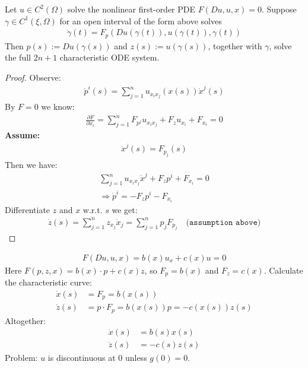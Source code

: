 \begin{theorem}
	Let $u \in C^2(\Omega)$ solve the nonlinear first-order PDE $F(Du, u, x) = 0$.
	Suppose $\gamma \in C^1(\xi, \Omega)$ for an open interval of the form above solves
	\begin{align*}
		\dot{\gamma}(t) = F_p (Du(\gamma(t)), u(\gamma(t)), \gamma(t))
	\end{align*}
	Then $p(s) := Du(\gamma(s))$ and $z(s) := u(\gamma(s))$, together with $\gamma$, solve the full $2n+1$ characteristic ODE system.
\end{theorem}
\begin{proof}
Observe:
\begin{align*}
	\dot{p}^i(s) = \sum_{j = 1}^n u_{x_i x_j}(x(s)) \dot{x}^j(s)
\end{align*}
By $F = 0$ we know:
\begin{align*}
	\frac{\partial F}{\partial x_i} = \sum_{j = 1}^n F_{p^j}u_{x_i x_j} + F_z u_{x_i} + F_{x_i} = 0
\end{align*}
\textbf{Assume:}
\begin{align}
	\dot{x}^j(s) = F_{p_j}(s)
\end{align}
Then we have:
\begin{align*}
	\sum_{j = 1}^n u_{x_i x_j} \dot{x}^j + F_z p^i + F_{x_i} = 0\\
	\Rightarrow \dot{p}^i = - F_z p^i - F_{x_i}
\end{align*}
Differentiate $z$ and $x$ w.r.t. $s$ we get:
\begin{align*}
	\dot{z}(s) = \sum_{j = 1}^n z_{x_j} \dot{x}_j = \sum_{j = 1}^n p_j F_{p_j} \quad\texttt{(assumption above)}
\end{align*}
\end{proof}



\begin{example}
\begin{align*}
	F(Du, u, x) = b(x)u_x + c(x)u = 0
\end{align*}
Here $F(p, z, x) = b(x)\cdot p + c(x)z$, so $F_p = b(x)$ and $F_z = c(x)$. Calculate the characteristic curve:
\begin{align*}
	\dot{x}(s) &= F_p = b(x(s))\\
	\dot{z}(s) &= p \cdot F_p = b(x(s)) p = - c(x(s)) z(s)
\end{align*}
Altogether:
\begin{align*}
	\dot{x}(s) &= b(s)x(s) \\
	\dot{z}(s) &= -c(s)z(s) 
\end{align*}
Problem: $u$ is discontinuous at $0$ unless $g(0) = 0$. 
\end{example}

